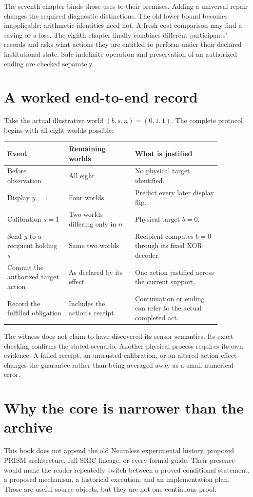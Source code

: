 \documentclass[11pt,oneside,openany]{book}
\theoremstyle{definition}\newtheorem{definition}[theorem]{Definition}
\begin{document}
The seventh chapter binds those uses to their premises. Adding a universal repair changes the required diagnostic distinctions. The old lower bound becomes inapplicable; arithmetic identities need not. A fresh cost comparison may find a saving or a loss. The eighth chapter finally combines different participants' records and asks what actions they are entitled to perform under their declared institutional state. Safe indefinite operation and preservation of an authorized ending are checked separately.

\section{A worked end-to-end record}
Take the actual illustrative world $(b,s,n)=(0,1,1)$. The complete protocol begins with all eight worlds possible:
\begin{center}\begin{tabular}{p{0.25\linewidth}p{0.27\linewidth}p{0.35\linewidth}}\toprule
Event & Remaining worlds & What is justified\\\midrule
Before observation & All eight & No physical target identified.\\
Display $y=1$ & Four worlds & Predict every later display flip.\\
Calibration $s=1$ & Two worlds differing only in $n$ & Physical target $b=0$.\\
Send $y$ to a recipient holding $s$ & Same two worlds & Recipient computes $b=0$ through its fixed XOR decoder.\\
Commit the authorized target action & As declared by its effect & One action justified across the current support.\\
Record the fulfilled obligation & Includes the action's receipt & Continuation or ending can refer to the actual completed act.\\\bottomrule\end{tabular}\end{center}

The witness does not claim to have discovered its sensor semantics. Its exact checking confirms the stated scenario. Another physical process requires its own evidence. A failed receipt, an untrusted calibration, or an altered action effect changes the guarantee rather than being averaged away as a small numerical error.

\section{Why the core is narrower than the archive}
This book does not append the old Neuralese experimental history, proposed PRISM architecture, full SRIC lineage, or every formal guide. Their presence would make the reader repeatedly switch between a proved conditional statement, a proposed mechanism, a historical execution, and an implementation plan. Those are useful source objects, but they are not one continuous proof.
\end{document}
